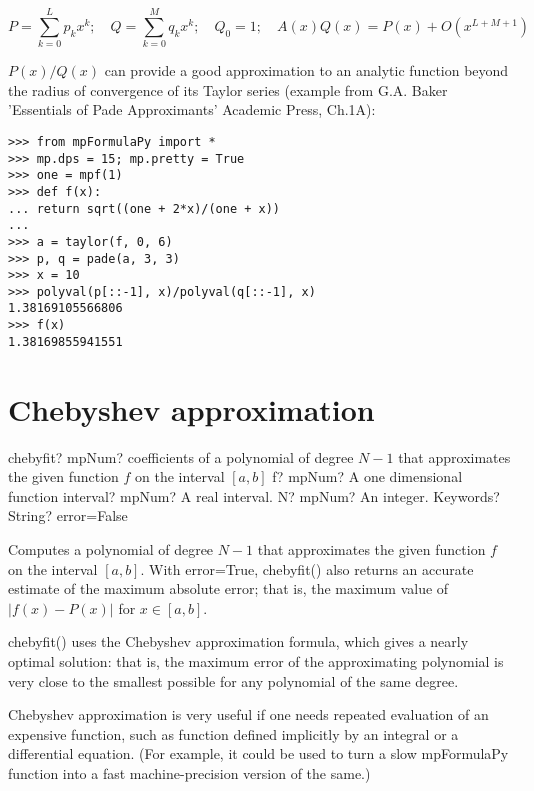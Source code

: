 \begin{equation}
P=\sum_{k=0}^L p_kx^k; \quad Q=\sum_{k=0}^M q_kx^k; \quad Q_0=1; \quad A(x)Q(x)=P(x)+O(x^{L+M+1})
\end{equation}

$P(x)/Q(x)$ can provide a good approximation to an analytic function beyond the radius of convergence of its Taylor series (example from G.A. Baker 'Essentials of Pade Approximants' Academic Press, Ch.1A):

\begin{lstlisting}
>>> from mpFormulaPy import *
>>> mp.dps = 15; mp.pretty = True
>>> one = mpf(1)
>>> def f(x):
... return sqrt((one + 2*x)/(one + x))
...
>>> a = taylor(f, 0, 6)
>>> p, q = pade(a, 3, 3)
>>> x = 10
>>> polyval(p[::-1], x)/polyval(q[::-1], x)
1.38169105566806
>>> f(x)
1.38169855941551
\end{lstlisting}




\newpage
\section{Chebyshev approximation}


\begin{mpFunctionsExtract}
	\mpFunctionFour
	{chebyfit? mpNum? coefficients of a polynomial of degree $N-1$ that approximates the given function $f$ on the interval $[a,b]$}
	{f? mpNum? A one dimensional function}
	{interval? mpNum? A real interval.}	
	{N? mpNum? An integer.}		
	{Keywords? String? error=False}	
\end{mpFunctionsExtract}

\vpara
Computes a polynomial of degree $N-1$ that approximates the given function $f$ on the interval $[a,b]$. With error=True, chebyfit() also returns an accurate estimate of the maximum absolute error; that is, the maximum value of $|f(x) - P(x)|$ for $x \in [a,b]$.

\vpara
chebyfit() uses the Chebyshev approximation formula, which gives a nearly optimal solution: that is, the maximum error of the approximating polynomial is very close to the smallest possible for any polynomial of the same degree.

\vpara
Chebyshev approximation is very useful if one needs repeated evaluation of an expensive function, such as function defined implicitly by an integral or a differential equation. (For example, it could be used to turn a slow mpFormulaPy function into a fast machine-precision version of the same.)

